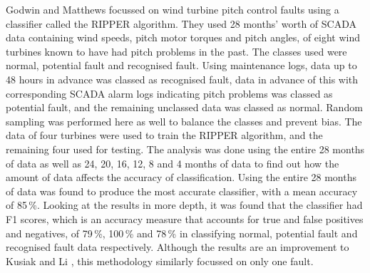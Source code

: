 Godwin and Matthews \cite{Godwi13} focussed on wind turbine pitch control faults using a classifier called the RIPPER algorithm. They used 28 months' worth of SCADA data containing wind speeds, pitch motor torques and pitch angles, of eight wind turbines known to have had pitch problems in the past. The classes used were normal, potential fault and recognised fault. Using maintenance logs, data up to 48 hours in advance was classed as recognised fault, data in advance of this with corresponding SCADA alarm logs indicating pitch problems was classed as potential fault, and the remaining unclassed data was classed as normal. Random sampling was performed here as well to balance the classes and prevent bias. The data of four turbines were used to train the RIPPER algorithm, and the remaining four used for testing. The analysis was done using the entire 28 months of data as well as 24, 20, 16, 12, 8 and 4 months of data to find out how the amount of data affects the accuracy of classification. Using the entire 28 months of data was found to produce the most accurate classifier, with a mean accuracy of 85\,\%. Looking at the results in more depth, it was found that the classifier had F1 scores, which is an accuracy measure that accounts for true and false positives and negatives, of 79\,\%, 100\,\% and 78\,\% in classifying normal, potential fault and recognised fault data respectively. Although the results are an improvement to Kusiak and Li \cite{Kusia11}, this methodology similarly focussed on only one fault.

